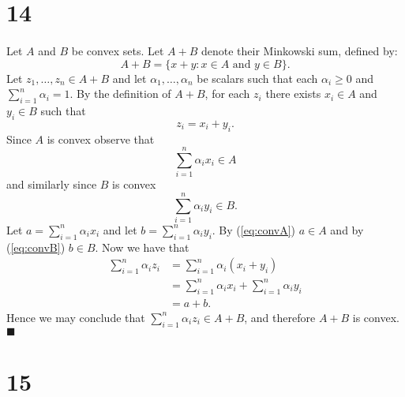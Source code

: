 \documentclass[letterpaper,12pt,oneside,onecolumn]{article}
\begin{document}
\section*{14}
\paragraph{}
Let $A$ and $B$ be convex sets. Let $A+B$ denote their Minkowski sum, defined by:
$$A+B = \{x+y : x\in A\text{ and } y\in B \}.$$
Let $z_1, \dots, z_n \in A+B$ and let $\alpha_1, \dots, \alpha_n$ be scalars such that each $\alpha_i \geq 0$ and $\sum_{i=1}^n \alpha_i = 1$. By the definition of $A+B$, for each $z_i$ there exists $x_i \in A$ and $y_i \in B$ such that $$z_i = x_i + y_i.$$
Since $A$ is convex observe that
\begin{equation}
\sum_{i=1}^n \alpha_i x_i \in A
\label{eq:convA}
\end{equation}
and similarly since $B$ is convex
\begin{equation}
\sum_{i=1}^n \alpha_i y_i \in B.
\label{eq:convB}
\end{equation}
Let $a = \sum_{i=1}^n \alpha_i x_i$ and let $b = \sum_{i=1}^n \alpha_i y_i$. By (\ref{eq:convA}) $a\in A$ and by (\ref{eq:convB}) $b \in B$. Now we have that
\begin{align*}
\sum_{i=1}^n \alpha_i z_i &= \sum_{i=1}^n \alpha_i(x_i + y_i) \\
&= \sum_{i=1}^n \alpha_i x_i + \sum_{i=1}^n \alpha_i y_i \\
&= a + b.
\end{align*}
Hence we may conclude that $\sum_{i=1}^n \alpha_i z_i \in A + B$, and therefore $A+B$ is convex. $\blacksquare$
\section*{15}
\end{document}
